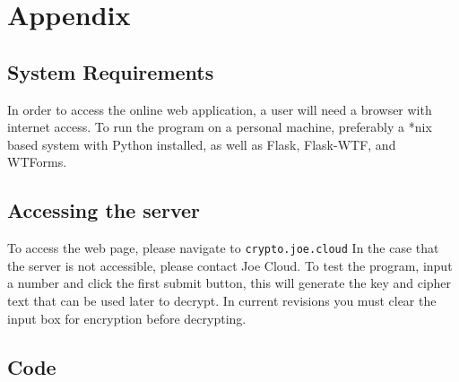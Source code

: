 \documentclass[a4paper]{article}
\begin{document}
\section{Appendix}
\subsection{System Requirements}
In order to access the online web application, a user will need a browser with internet access.
To run the program on a personal machine, preferably a *nix based system with Python installed, as well as Flask, Flask-WTF, and WTForms.
\subsection{Accessing the server} 
To access the web page, please navigate to \texttt{crypto.joe.cloud}
In the case that the server is not accessible, please contact Joe Cloud.
To test the program, input a number and click the first submit button, this will generate the key and cipher text that can be used later to decrypt. In current revisions you must clear the input box for encryption before decrypting.

\newpage
\subsection{Code}
\end{document}
